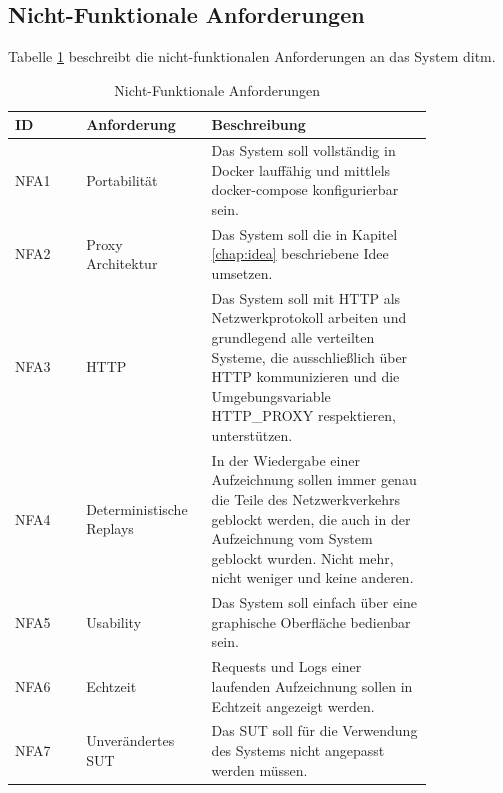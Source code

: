 \documentclass[12pt,a4paper]{report}
\begin{document}
\subsection{Nicht-Funktionale Anforderungen}
Tabelle \ref{tab:nfa} beschreibt die nicht-funktionalen Anforderungen an das System ditm.
\begin{longtable}[H]{|p{}|p{0.3\linewidth}|p{0.53\linewidth}|}
	\caption{Nicht-Funktionale Anforderungen\label{tab:nfa}}                                                                                                                                                                                        \\
	\hline
	ID   & Anforderung              & Beschreibung                                                                                                                                                                                                  \\ \hline
	NFA1 & Portabilität             & Das System soll vollständig in Docker lauffähig und mittlels docker-compose konfigurierbar sein.                                                                                                         \\ \hline
	NFA2 & Proxy Architektur        & Das System soll die in Kapitel \ref{chap:idea} beschriebene Idee umsetzen.                                                                                                                                    \\ \hline
	NFA3 & HTTP                     & Das System soll mit HTTP als Netzwerkprotokoll arbeiten und grundlegend alle verteilten Systeme, die ausschließlich über HTTP kommunizieren und die Umgebungsvariable HTTP\_PROXY respektieren, unterstützen. \\ \hline
	NFA4 & Deterministische Replays & In der Wiedergabe einer Aufzeichnung sollen immer genau die Teile des Netzwerkverkehrs geblockt werden, die auch in der Aufzeichnung vom System geblockt wurden. Nicht mehr, nicht weniger und keine anderen. \\ \hline
	NFA5 & Usability                & Das System soll einfach über eine graphische Oberfläche bedienbar sein.                                                                                                                                       \\ \hline
	NFA6 & Echtzeit                 & Requests und Logs einer laufenden Aufzeichnung sollen in Echtzeit angezeigt werden.                                                                                                                         \\ \hline
	NFA7 & Unverändertes SUT        & Das SUT soll für die Verwendung des Systems nicht angepasst werden müssen.                                                                                                                                    \\ \hline
\end{longtable}
\end{document}
